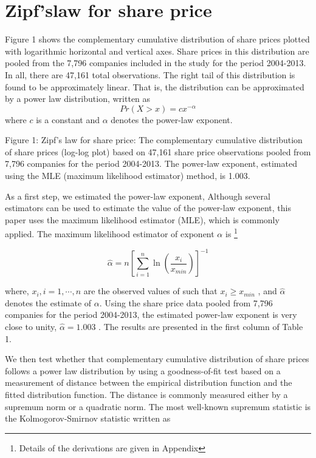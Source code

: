\documentclass[10pt,a4paper]{article}
\begin{document}
\section{Zipf'slaw for share price}   
Figure 1 shows the complementary cumulative distribution of share prices plotted with logarithmic horizontal and vertical axes. Share prices in this distribution are pooled from the 7,796 companies included in the study for the period 2004-2013. In all, there are 47,161 total observations. The right tail of this distribution is found to be approximately linear. That is, the distribution can be approximated by a power law distribution, written as 
\begin{equation}
  Pr(X > x) =cx^{-\alpha}   
\end{equation}
where $c$  is a constant and $\alpha$ denotes the power-law exponent. 

Figure 1: Zipf's law for share price: The complementary cumulative distribution of share prices (log-log plot) based on 47,161 share price observations pooled from 7,796 companies for the period 2004-2013. The power-law exponent, estimated using the MLE (maximum likelihood estimator) method, is 1.003.

As a first step, we estimated the power-law exponent, Although several estimators can be used to estimate the value of the power-law exponent, this paper uses the maximum likelihood estimator (MLE), which is commonly applied. The maximum likelihood estimator of exponent $\alpha$  is \footnote{Details of the derivations are given in Appendix}

\begin{equation}
\hat{\alpha}=n[\sum_{i=1}^{n}\ln (\frac{x_{i}}{x_{min}}) ]^{-1}
\end{equation}

where, $x_{i}, i=1,\cdots , n$  are the observed values of   such that $x_{i}\ge x_{min}$  , and  $\hat{\alpha}$ denotes the estimate of $\alpha$. Using the share price data pooled from 7,796 companies for the period 2004-2013, the estimated power-law exponent is very close to unity, $\hat{\alpha}=1.003$ . The results are presented in the first column of Table 1. 

We then test whether that complementary cumulative distribution of share prices follows a power law distribution by using a goodness-of-fit test based on a measurement of distance between the empirical  distribution function and the fitted   distribution function. The distance is commonly measured either by a supremum norm or a quadratic norm. The most well-known supremum statistic is the Kolmogorov-Smirnov statistic written as
\end{document}
